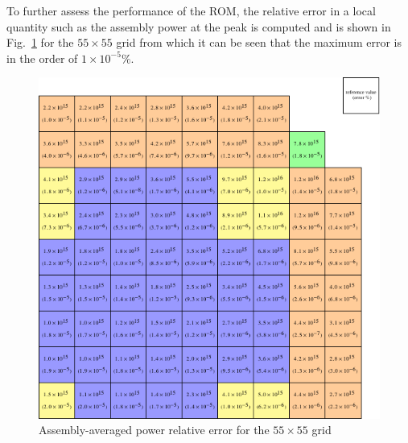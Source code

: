 \documentclass[review,number,sort&compress,12pt]{elsarticle}
\begin{document}
To further assess the performance of the ROM, the relative error in a local quantity such as the assembly power at the peak is computed and is shown in Fig.~\ref{fig:assembly power error fm=5} for the $55\times 55$ grid from which it can be seen that the maximum error is in the order of $1\times 10^{-5}\%$.

\begin{figure}[H]
	\centering
	\includegraphics[width=0.7\linewidth]{../figures/lra_assemb_fm=5.pdf} 
	\caption{Assembly-averaged power relative error for the $55\times 55$ grid}
	\label{fig:assembly power error fm=5}
\end{figure} 
\end{document}
